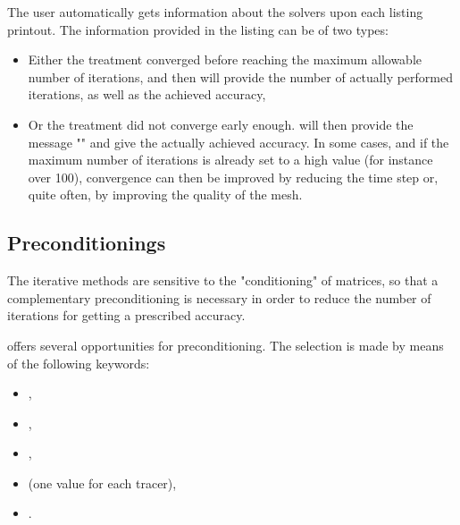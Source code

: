 The user automatically gets information about the solvers upon each listing
printout. The information provided in the listing can be of two types:

\begin{itemize}
\item Either the treatment converged before reaching the maximum allowable
number of iterations, and then  will provide the number of actually
performed iterations, as well as the achieved accuracy,

\item Or the treatment did not converge early enough.  will then
provide the message "" and give
the actually achieved accuracy. In some cases, and if the maximum number of
iterations is already set to a high value (for instance over 100), convergence
can then be improved by reducing the time step or, quite often, by improving
the quality of the mesh.
\end{itemize}


\subsection{Preconditionings}
\label{sec:precond}
The iterative methods are sensitive to the "conditioning" of matrices, so that
a complementary preconditioning is necessary in order to reduce the number of
iterations for getting a prescribed accuracy.

 offers several opportunities for preconditioning. The selection is
made by means of the following keywords:

\begin{itemize}
\item {},

\item {},

\item {},

%
\item {} (one value for each
tracer),

\item {}.
\end{itemize}

